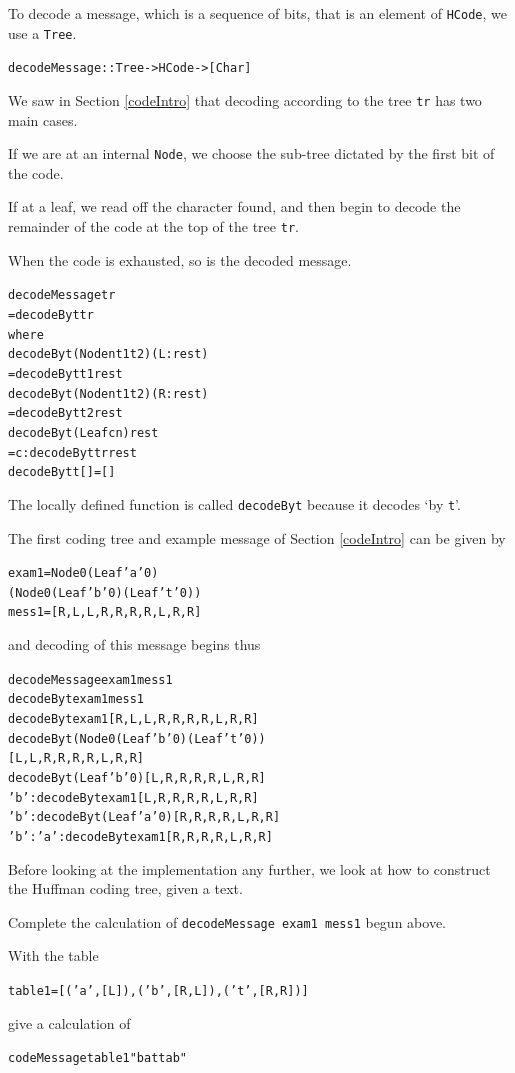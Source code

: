 To decode a message, which is a sequence of bits,  that is an element of
\texttt{HCode}, we use a \texttt{Tree}. 
\begin{alltt}
decodeMessage :: Tree -> HCode -> [Char]
\end{alltt}
We saw in Section \ref{codeIntro} that decoding according to the tree \texttt{tr}
has two main cases. 
\begin{titemize}
\item If we are at an internal \texttt{Node}, we choose the sub-tree dictated by
the first bit of the code.
\item If at a leaf, we read off the character found, and then begin to decode
the remainder of the code at the top of the tree \texttt{tr}.
\end{titemize}
When the code is exhausted, so is the decoded message.
\begin{alltt}
decodeMessage tr
  = decodeByt tr
    where
    decodeByt (Node n t1 t2) (L:rest)
      = decodeByt t1 rest
    decodeByt (Node n t1 t2) (R:rest)
      = decodeByt t2 rest
    decodeByt (Leaf c n) rest
      = c : decodeByt tr rest
    decodeByt t [] = []
\end{alltt}
The locally defined function is called \texttt{decodeByt} because it decodes `by
\texttt{t}'.

The first coding tree and example message of Section \ref{codeIntro} can be
given by
\begin{alltt}
exam1 = Node 0 (Leaf 'a' 0)
               (Node 0 (Leaf 'b' 0) (Leaf 't' 0))
mess1 = [R,L,L,R,R,R,R,L,R,R]
\end{alltt}
and decoding of this message begins thus
\begin{alltt}
decodeMessage exam1 mess1
\step decodeByt exam1 mess1
\step decodeByt exam1 [R,L,L,R,R,R,R,L,R,R]
\step decodeByt (Node 0 (Leaf 'b' 0) (Leaf 't' 0)) 
                                 [L,L,R,R,R,R,L,R,R]
\step decodeByt (Leaf 'b' 0) [L,R,R,R,R,L,R,R]
\step 'b' : decodeByt exam1 [L,R,R,R,R,L,R,R] 
\step 'b' : decodeByt (Leaf 'a' 0) [R,R,R,R,L,R,R]
\step 'b' : 'a' : decodeByt exam1 [R,R,R,R,L,R,R] 
\end{alltt}
Before looking at the implementation any further, we look at how to construct
the Huffman coding tree, given a text.

\begin{exercises}

\item
Complete the calculation of \texttt{decodeMessage exam1 mess1} begun above.

\item
With the table
\begin{alltt}
table1 = [ ('a',[L]) , ('b',[R,L]) , ('t',[R,R]) ]
\end{alltt}
give a calculation of 
\begin{alltt}
codeMessage table1 "battab"
\end{alltt}
\end{exercises}
